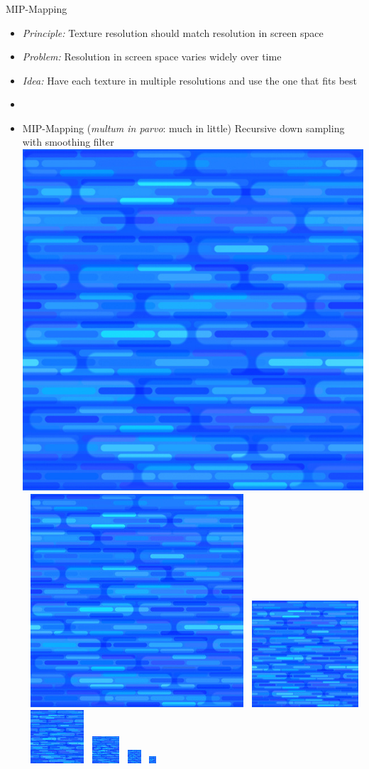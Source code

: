 \documentclass[utf8,stillsansserifmath,fleqn,t]{beamer}
\begin{document}
\begin{frame}[label=texture-mipmap]
\frametitle{\insertsection}
MIP-Mapping
\begin{itemize}
\item \emph{Principle:} Texture resolution should match resolution in screen space
\item \emph{Problem:} Resolution in screen space varies widely over time
\item \emph{Idea:} Have each texture in multiple resolutions and use the one
that fits best
\item[~]
\item MIP-Mapping (\emph{multum in parvo}: much in little)
    \hspace*{.4\textwidth}Recursive down sampling\\
    \hspace*{.4\textwidth}with smoothing filter\\
    \vspace*{-2\baselineskip}
    \includegraphics[width=.320\textwidth]{./fig/mipmap-0.jpg}~
    \includegraphics[width=.160\textwidth]{./fig/mipmap-1.jpg}~
    \includegraphics[width=.080\textwidth]{./fig/mipmap-2.jpg}~
    \includegraphics[width=.040\textwidth]{./fig/mipmap-3.jpg}~
    \includegraphics[width=.020\textwidth]{./fig/mipmap-4.jpg}~
    \includegraphics[width=.010\textwidth]{./fig/mipmap-5.jpg}~
    \includegraphics[width=.005\textwidth]{./fig/mipmap-6.jpg}~
\end{itemize}
\end{frame}
\end{document}
